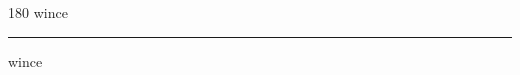 
\begin{frame}
\begin{center}
\begin{turn}{180}
{\fontsize{2.5cm}{1em}\selectfont wince}
\end{turn}
\vspace{1em}\par  
\hrule
\vspace{1em}\par  
{\fontsize{2.5cm}{1em}\selectfont wince}
\end{center}
\end{frame}
